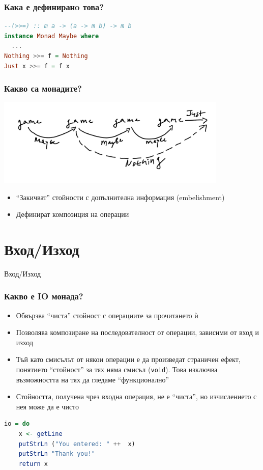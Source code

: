 \documentclass{beamer}
\begin{document}
\begin{frame}[fragile]
  \frametitle{Кака е дефиниранo това?}

\begin{lstlisting}[basicstyle=\small,language=Haskell]
--(>>=) :: m a -> (a -> m b) -> m b
instance Monad Maybe where
  ...
Nothing >>= f = Nothing
Just x >>= f = f x
\end{lstlisting}

\end{frame}


\begin{frame}[fragile]
  \frametitle{Какво са монадите?}

  \includegraphics[width=110mm]{images/composition}

\begin{itemize}
  \item ``Закичват'' стойности с допълнителна информация (embelishment)
  \item Дефинират композиция на операции
\end{itemize}

\end{frame}

\section{Вход/Изход}
\begin{frame}
  \centerline{Вход/Изход}
\end{frame}


\begin{frame}[fragile]
  \frametitle{Какво е IO монада?}
\begin{itemize}
  \item Обвързва ``чиста'' стойност с операциите за прочитането ѝ
  \item Позволява композиране на последователност от операции, зависими от вход и изход
  \item Тъй като смисълът от някои операции е да произведат страничен ефект, понятието ``стойност'' за тях няма смисъл (\texttt{void}). Това изключва възможността на тях да гледаме ``функционално''
  \item Стойността, получена чрез входна операция, не е ``чиста'', но изчислението с нея може да е чисто
\end{itemize}

\begin{lstlisting}[basicstyle=\small,language=Haskell]
io = do 
    x <- getLine
    putStrLn ("You entered: " ++  x)
    putStrLn "Thank you!"
    return x
\end{lstlisting}
  
\end{frame}
\end{document}
